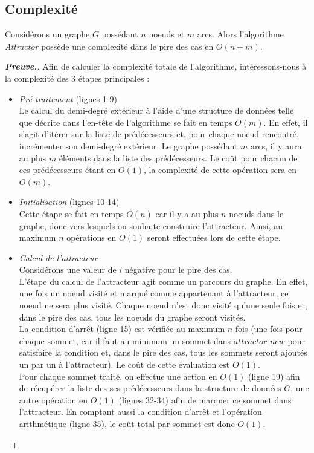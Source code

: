 \documentclass[12pt,a4paper,oneside,titlepage]{report}
\newenvironment{demonstration}{\begin{proof}[\textnormal{\textbf{Preuve.}}]}{\end{proof}}
\begin{document}
\subsection{Complexité}
Considérons un graphe $G$ possédant $n$ noeuds et $m$ arcs. Alors l'algorithme \emph{Attractor} possède une complexité dans le pire des cas en $O(n+m)$.
\begin{demonstration}
Afin de calculer la complexité totale de l'algorithme, intéressons-nous à la complexité des 3 étapes principales :
\begin{itemize}
\item \textit{Pré-traitement} (lignes 1-9)\\
Le calcul du demi-degré extérieur à l'aide d'une structure de données telle que décrite dans l'en-tête de l'algorithme se fait en temps $O(m)$. En effet, il s'agit d'itérer sur la liste de prédécesseurs et, pour chaque noeud rencontré, incrémenter son demi-degré extérieur. Le graphe possédant $m$ arcs, il y aura au plus $m$ éléments dans la liste des prédécesseurs. Le coût pour chacun de ces prédécesseurs étant en $O(1)$, la complexité de cette opération sera en $O(m)$.
\item \textit{Initialisation} (lignes 10-14)\\
Cette étape se fait en temps $O(n)$ car il y a au plus $n$ noeuds dans le graphe, donc vers lesquels on souhaite construire l'attracteur. Ainsi, au maximum $n$ opérations en $O(1)$ seront effectuées lors de cette étape.
\item \textit{Calcul de l'attracteur}\\
Considérons une valeur de $i$ négative pour le pire des cas.\\
L'étape du calcul de l'attracteur agit comme un parcours du graphe. En effet, une fois un noeud visité et marqué comme appartenant à l'attracteur, ce noeud ne sera plus visité. Chaque noeud n'est donc visité qu'une seule fois et, dans le pire des cas, tous les noeuds du graphe seront visités.\\
La condition d'arrêt (ligne 15) est vérifiée au maximum $n$ fois (une fois pour chaque sommet, car il faut au minimum un sommet dans $attractor\_new$ pour satisfaire la condition et, dans le pire des cas, tous les sommets seront ajoutés un par un à l'attracteur). Le coût de cette évaluation est $O(1)$.\\
Pour chaque sommet traité, on effectue une action en $O(1)$ (ligne 19) afin de récupérer la liste des ses prédécesseurs dans la structure de données $G$, une autre opération en $O(1)$ (lignes 32-34) afin de marquer ce sommet dans l'attracteur. En comptant aussi la condition d'arrêt et l'opération arithmétique (ligne 35), le coût total par sommet est donc $O(1)$.\\

\end{itemize}
\end{demonstration}
\end{document}
